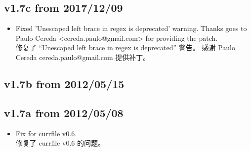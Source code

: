 \documentclass{article}
\begin{document}
\subsection*{v1.7c from 2017/12/09}
\begin{itemize}
 \item Fixed 'Unescaped left brace in regex is deprecated' warning.
   Thanks goes to Paulo Cereda <cereda.paulo@gmail.com> for providing the patch.
\\修复了 ``Unescaped left brace in regex is deprecated'' 警告。 感谢 Paulo Cereda cereda.paulo@gmail.com 提供补丁。
\end{itemize}

\subsection*{v1.7b from 2012/05/15}

\subsection*{v1.7a from 2012/05/08}
\begin{itemize}
 \item Fix for currfile v0.6.
\\修复了 currfile v0.6 的问题。
\end{itemize}
\end{document}
